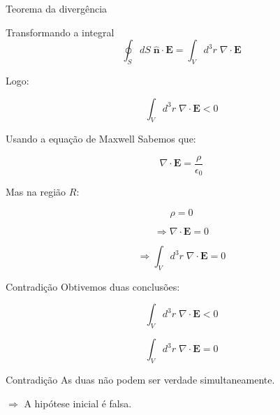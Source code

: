 \documentclass[aspectratio=169,11pt]{beamer}
\begin{document}
\begin{frame}{Teorema da divergência}
\begin{block}{Transformando a integral}
\begin{equation}
\oint_S dS \; \hat{\mathbf n}\cdot \mathbf E
=
\int_V d^3r \; \nabla \cdot \mathbf E
\end{equation}
\end{block}

\pause

Logo:

\begin{equation}
\int_V d^3r \; \nabla \cdot \mathbf E < 0
\tag{3.22}
\end{equation}
\end{frame}

\begin{frame}{Usando a equação de Maxwell}
Sabemos que:

\begin{equation}
\nabla \cdot \mathbf E = \frac{\rho}{\epsilon_0}
\end{equation}

\pause

Mas na região $R$:

\begin{equation}
\rho = 0
\end{equation}

\pause

\begin{equation}
\Rightarrow \nabla \cdot \mathbf E = 0
\end{equation}

\pause

\begin{equation}
\Rightarrow
\int_V d^3r \; \nabla \cdot \mathbf E = 0
\end{equation}
\end{frame}

\begin{frame}{Contradição}
Obtivemos duas conclusões:

\begin{equation}
\int_V d^3r \; \nabla \cdot \mathbf E < 0
\end{equation}

\begin{equation}
\int_V d^3r \; \nabla \cdot \mathbf E = 0
\end{equation}

\pause

\begin{alertblock}{Contradição}
As duas não podem ser verdade simultaneamente.
\end{alertblock}

\pause

\begin{center}
$\Rightarrow$ A hipótese inicial é falsa.
\end{center}
\end{frame}
\end{document}
